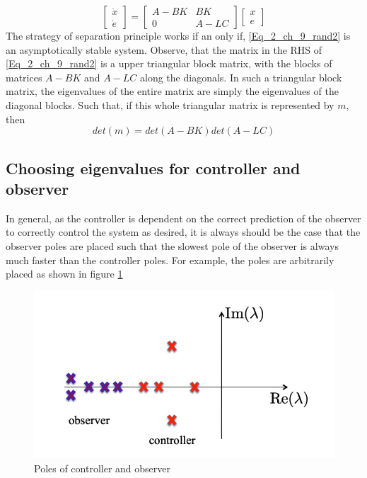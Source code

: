 \begin{enumerate}
\begin{equation}
		\begin{bmatrix}
		\dot{x} \\ \dot{e}
		\end{bmatrix} = \begin{bmatrix}
			A - BK & BK \\ 0 & A - LC
		\end{bmatrix} \begin{bmatrix}
			x \\ e
		\end{bmatrix}
	\end{equation}
	The strategy of separation principle works if an only if, \eqref{Eq_2_ch_9_rand2} is an asymptotically stable system.
	Observe, that the matrix in the RHS of \eqref{Eq_2_ch_9_rand2} is a upper triangular block matrix, with the blocks of matrices $A - BK$ and $A - LC$ along the diagonals. In such a triangular block matrix, the eigenvalues of the entire matrix are simply the eigenvalues of the diagonal blocks. Such that, if this whole triangular matrix is represented by $m$, then
	\begin{equation}
		det(m) = det(A - BK) det(A - LC)
	\end{equation}
\end{enumerate}

\subsection{Choosing eigenvalues for controller and observer}

In general, as the controller is dependent on the correct prediction of the observer to correctly control the system as desired, it is always should be the case that the observer poles are placed such that the slowest pole of the observer is always much faster than the controller poles. For example, the poles are arbitrarily placed as shown in figure \ref{fig_2_ch_9_polesofControllerAndObserver}
\begin{figure}[h!]
	\centering
	\includegraphics[width=0.65\linewidth]{Bilder/SS5.png}
	\caption{Poles of controller and observer}
	\label{fig_2_ch_9_polesofControllerAndObserver}
\end{figure}

